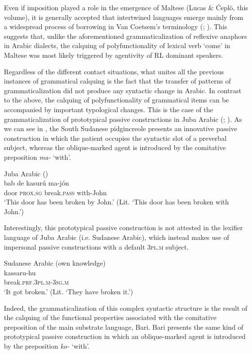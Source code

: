 \documentclass[output=paper]{langsci/langscibook}
\begin{document}
Even if imposition played a role in the emergence of Maltese (Lucas \& Ćeplö, this volume), it is generally accepted that intertwined languages emerge mainly from a widespread process of borrowing in Van Coetsem’s terminology (\citealt[397]{Winford2005}; \citealt{Manfredi2018}). This suggests that, unlike the aforementioned grammaticalization of reflexive anaphors in Arabic dialects, the calquing of polyfunctionality of lexical verb ‘come’ in Maltese was most likely triggered by agentivity of RL dominant speakers. 

Regardless of the different contact situations, what unites all the previous instances of grammatical calquing is the fact that the transfer of patterns of grammaticalization did not produce any syntactic change in Arabic. In contrast to the above, the calquing of polyfunctionality of grammatical items can be accompanied by important typological changes. This is the case of the grammaticalization of prototypical passive constructions in Juba Arabic (\citealt[92]{Manfredi2017}; \citeyear[415]{Manfredi2018}). As we can see in , the South Sudanese pidgincreole presents an innovative passive construction in which the patient occupies the syntactic slot of a preverbal subject, whereas the oblique-marked agent is introduced by the comitative preposition \textit{ma-} ‘with’.  

\ea\label{passive}
{Juba Arabic (\citealt[86]{Manfredi2017})}\\
\gll   bab de kasurú ma-jón \\
       door \textsc{prox.sg} break.\textsc{pass} with-John\\
\glt   `This door has been broken by John.' (Lit. ‘This door has been broken with John.’)
\z
 
Interestingly, this prototypical passive construction is not attested in the lexifier language of Juba Arabic (i.e. Sudanese Arabic), which instead makes use of impersonal passive constructions with a default \textsc{3pl.m} subject.

\ea
{Sudanese Arabic (own knowledge)}\\
\gll   kassaru-hu\\
       break.\textsc{prf.3pl.m-3sg.m}\\
\glt   `It got broken.' (Lit. ‘They have broken it.’) 
\z

Indeed, the grammaticalization of this complex syntactic structure is the result of the calquing of the functional properties associated with the comitative preposition of the main substrate language, Bari. Bari presents the same kind of prototypical passive construction in which an oblique-marked agent is introduced by the preposition \textit{ko-} ‘with’.
\end{document}

